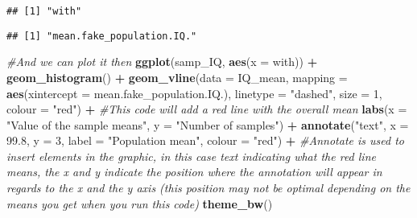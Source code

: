 \documentclass[
]{book}
\newenvironment{Shaded}{\begin{snugshade}}{\end{snugshade}}
\newcommand{\AttributeTok}[1]{\textcolor[rgb]{0.13,0.29,0.53}{#1}}
\newcommand{\CommentTok}[1]{\textcolor[rgb]{0.56,0.35,0.01}{\textit{#1}}}
\newcommand{\DecValTok}[1]{\textcolor[rgb]{0.00,0.00,0.81}{#1}}
\newcommand{\FloatTok}[1]{\textcolor[rgb]{0.00,0.00,0.81}{#1}}
\newcommand{\FunctionTok}[1]{\textcolor[rgb]{0.13,0.29,0.53}{\textbf{#1}}}
\newcommand{\NormalTok}[1]{#1}
\newcommand{\OtherTok}[1]{\textcolor[rgb]{0.56,0.35,0.01}{#1}}
\newcommand{\SpecialCharTok}[1]{\textcolor[rgb]{0.81,0.36,0.00}{\textbf{#1}}}
\newcommand{\StringTok}[1]{\textcolor[rgb]{0.31,0.60,0.02}{#1}}
\begin{document}
\begin{verbatim}
## [1] "with"
\end{verbatim}

\begin{Shaded}
\end{Shaded}

\begin{verbatim}
## [1] "mean.fake_population.IQ."
\end{verbatim}

\begin{Shaded}
\begin{Highlighting}[]
\CommentTok{\#And we can plot it then}
\FunctionTok{ggplot}\NormalTok{(samp\_IQ, }\FunctionTok{aes}\NormalTok{(}\AttributeTok{x =}\NormalTok{ with)) }\SpecialCharTok{+} 
  \FunctionTok{geom\_histogram}\NormalTok{() }\SpecialCharTok{+}
  \FunctionTok{geom\_vline}\NormalTok{(}\AttributeTok{data =}\NormalTok{ IQ\_mean, }\AttributeTok{mapping =} \FunctionTok{aes}\NormalTok{(}\AttributeTok{xintercept =}\NormalTok{ mean.fake\_population.IQ.), }
             \AttributeTok{linetype =} \StringTok{"dashed"}\NormalTok{, }\AttributeTok{size =} \DecValTok{1}\NormalTok{, }\AttributeTok{colour =} \StringTok{"red"}\NormalTok{) }\SpecialCharTok{+} \CommentTok{\#This code will add a red line with the overall mean}
  \FunctionTok{labs}\NormalTok{(}\AttributeTok{x =} \StringTok{"Value of the sample means"}\NormalTok{, }\AttributeTok{y =} \StringTok{"Number of samples"}\NormalTok{) }\SpecialCharTok{+}
  \FunctionTok{annotate}\NormalTok{(}\StringTok{"text"}\NormalTok{, }\AttributeTok{x =} \FloatTok{99.8}\NormalTok{, }\AttributeTok{y =} \DecValTok{3}\NormalTok{, }\AttributeTok{label =} \StringTok{"Population mean"}\NormalTok{, }\AttributeTok{colour =} \StringTok{"red"}\NormalTok{) }\SpecialCharTok{+} \CommentTok{\#Annotate is used to insert elements in the graphic, in this case text indicating what the red line means, the x and y indicate the position where the annotation will appear in regards to the x and the y axis (this position may not be optimal depending on the means you get when you run this code)}
  \FunctionTok{theme\_bw}\NormalTok{()}
\end{Highlighting}
\end{Shaded}
\end{document}
